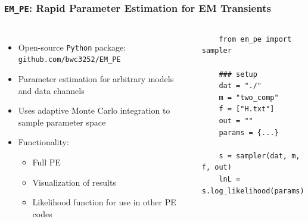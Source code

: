 \documentclass{beamer}
\begin{document}
\begin{frame}[fragile] \frametitle{\texttt{EM\_PE}: Rapid Parameter Estimation for EM Transients}
  \begin{columns}[c]
    \column{2.0in}
    \begin{itemize}
      \item Open-source \texttt{Python} package: \texttt{github.com/bwc3252/EM\_PE} \pause
      \item Parameter estimation for arbitrary models and data channels \pause
      \item Uses adaptive Monte Carlo integration to sample parameter space \pause
      \item Functionality: \pause
      \begin{itemize}
        \item Full PE \pause
        \item Visualization of results \pause
        \item Likelihood function for use in other PE codes \pause
      \end{itemize}
    \end{itemize}
    \column{3.0in}
    \begin{verbatim}
    from em_pe import sampler

    ### setup
    dat = "./"
    m = "two_comp"
    f = ["H.txt"]
    out = ""
    params = {...}

    s = sampler(dat, m, f, out)
    lnL = s.log_likelihood(params)
    \end{verbatim}
  \end{columns}
\end{frame}
\end{document}
